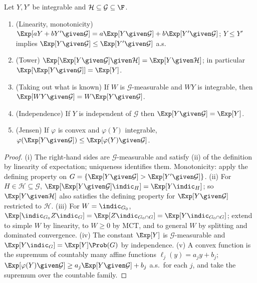 \begin{theorem}[Properties]\label{thm:condexpprops}
Let $Y,Y'$ be integrable and $\mathcal H\subseteq\mathcal G\subseteq\F$.
\begin{enumerate}[label=(\roman*)]
\item (Linearity, monotonicity) $\Exp[aY+bY'\given\mathcal G]=a\Exp[Y\given\mathcal G]+b\Exp[Y'\given\mathcal G]$; $Y\le Y'$ implies $\Exp[Y\given\mathcal G]\le\Exp[Y'\given\mathcal G]$ a.s.
\item (Tower) $\Exp[\Exp[Y\given\mathcal G]\given\mathcal H]=\Exp[Y\given\mathcal H]$; in particular $\Exp[\Exp[Y\given\mathcal G]]=\Exp[Y]$.
\item (Taking out what is known) If $W$ is $\mathcal G$-measurable and $WY$ is integrable, then $\Exp[WY\given\mathcal G]=W\Exp[Y\given\mathcal G]$.
\item (Independence) If $Y$ is independent of $\mathcal G$ then $\Exp[Y\given\mathcal G]=\Exp[Y]$.
\item (Jensen) If $\varphi$ is convex and $\varphi(Y)$ integrable, $\varphi(\Exp[Y\given\mathcal G])\le\Exp[\varphi(Y)\given\mathcal G]$.
\end{enumerate}
\end{theorem}
\begin{proof}
(i) The right-hand sides are $\mathcal G$-measurable and satisfy (ii) of the definition by linearity
of expectation; uniqueness identifies them. Monotonicity: apply the defining property on
$G=\{\Exp[Y\given\mathcal G]>\Exp[Y'\given\mathcal G]\}$. (ii) For $H\in\mathcal H\subseteq\mathcal G$,
$\Exp[\Exp[Y\given\mathcal G]\indic_H]=\Exp[Y\indic_H]$; so $\Exp[Y\given\mathcal H]$ also satisfies the
defining property for $\Exp[Y\given\mathcal G]$ restricted to $\mathcal H$. (iii) For
$W=\indic_{G_0}$, $\Exp[\indic_{G_0}Z\indic_G]=\Exp[Z\indic_{G_0\cap G}]=\Exp[Y\indic_{G_0\cap G}]$;
extend to simple $W$ by linearity, to $W\ge0$ by MCT, and to general $W$ by splitting and
dominated convergence. (iv) The constant $\Exp[Y]$ is $\mathcal G$-measurable and
$\Exp[Y\indic_G]=\Exp[Y]\Prob(G)$ by independence. (v) A convex function is the supremum of
countably many affine functions $\ell_j(y)=a_jy+b_j$; $\Exp[\varphi(Y)\given\mathcal G]\ge a_j\Exp[Y\given\mathcal G]+b_j$
a.s.\ for each $j$, and take the supremum over the countable family.
\end{proof}

